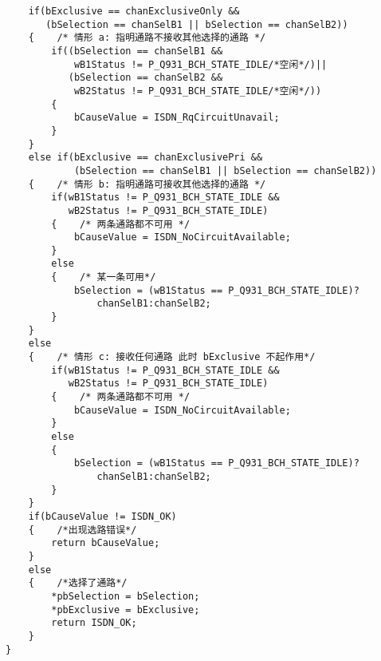 ﻿\documentclass  [11pt,onecolumn]{article}
\begin{document}
\begin{lstlisting}
    if(bExclusive == chanExclusiveOnly &&
       (bSelection == chanSelB1 || bSelection == chanSelB2))
    {    /* 情形 a: 指明通路不接收其他选择的通路 */
        if((bSelection == chanSelB1 && 
            wB1Status != P_Q931_BCH_STATE_IDLE/*空闲*/)||
           (bSelection == chanSelB2 && 
            wB2Status != P_Q931_BCH_STATE_IDLE/*空闲*/))
        {
            bCauseValue = ISDN_RqCircuitUnavail;
        }
    }
    else if(bExclusive == chanExclusivePri &&
            (bSelection == chanSelB1 || bSelection == chanSelB2))
    {    /* 情形 b: 指明通路可接收其他选择的通路 */
        if(wB1Status != P_Q931_BCH_STATE_IDLE && 
           wB2Status != P_Q931_BCH_STATE_IDLE)
        {    /* 两条通路都不可用 */
            bCauseValue = ISDN_NoCircuitAvailable;
        }
        else
        {    /* 某一条可用*/
            bSelection = (wB1Status == P_Q931_BCH_STATE_IDLE)?
                chanSelB1:chanSelB2;
        }
    }
    else
    {    /* 情形 c: 接收任何通路 此时 bExclusive 不起作用*/
        if(wB1Status != P_Q931_BCH_STATE_IDLE &&
           wB2Status != P_Q931_BCH_STATE_IDLE)
        {    /* 两条通路都不可用 */
            bCauseValue = ISDN_NoCircuitAvailable;
        }
        else
        {
            bSelection = (wB1Status == P_Q931_BCH_STATE_IDLE)?
                chanSelB1:chanSelB2;
        }
    }
    if(bCauseValue != ISDN_OK)
    {    /*出现选路错误*/
        return bCauseValue;
    }
    else
    {    /*选择了通路*/
        *pbSelection = bSelection;
        *pbExclusive = bExclusive;
        return ISDN_OK;
    }
}
\end{lstlisting}

\pagebreak
\end{document}
